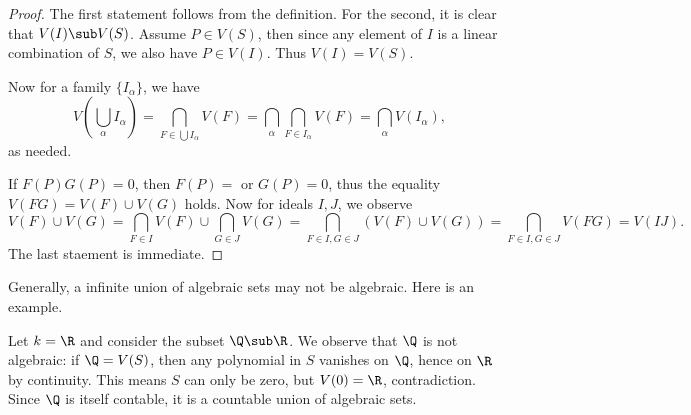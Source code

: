 \begin{proof}
The first statement follows from the definition. For the second, it is clear that $V(I)\sub V(S)$. Assume $P\in V(S)$, then since any element of $I$ is a linear combination of $S$, we also have $P\in V(I)$. Thus $V(I)=V(S)$.\par
Now for a family $\{I_\alpha\}$, we have
\[V(\bigcup_\alpha I_\alpha)=\bigcap_{F\in\bigcup I_\alpha}V(F)=\bigcap_{\alpha}\bigcap_{F\in I_\alpha}V(F)=\bigcap_{\alpha}V(I_\alpha),\]
as needed.\par
If $F(P)G(P)=0$, then $F(P)=$ or $G(P)=0$, thus the equality $V(FG)=V(F)\cup V(G)$ holds. Now for ideals $I,J$, we observe
\[V(F)\cup V(G)=\bigcap_{F\in I}V(F)\cup\bigcap_{G\in J}V(G)=\bigcap_{F\in I,G\in J}(V(F)\cup V(G))=\bigcap_{F\in I,G\in J}V(FG)=V(IJ).\]
The last staement is immediate.
\end{proof}
Generally, a infinite union of algebraic sets may not be algebraic. Here is an example.
\begin{example}
Let $k=\R$ and consider the subset $\Q\sub\R$. We observe that $\Q$ is not algebraic: if $\Q=V(S)$, then any polynomial in $S$ vanishes on $\Q$, hence on $\R$ by continuity. This means $S$ can only be zero, but $V(0)=\R$, contradiction. Since $\Q$ is itself contable, it is a countable union of algebraic sets.
\end{example}
